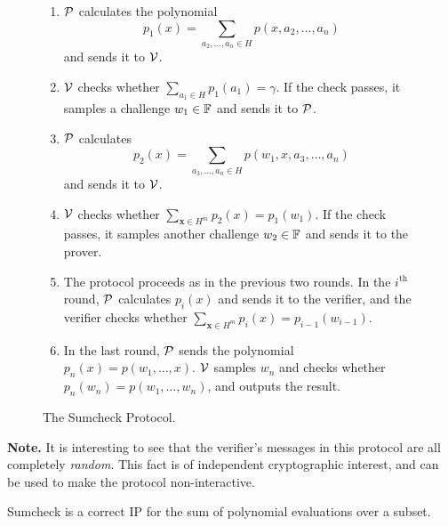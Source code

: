 \begin{figure}[h]
	\begin{mdframed}[
		linecolor=black,
		linewidth=1pt,
		roundcorner=5pt,
		backgroundcolor=white,
		userdefinedwidth=\textwidth,
		]
		\vspace{2mm}
		\begin{enumerate}
			\item $\mathcal{P}$ calculates the polynomial 
			$$p_1(x)=\sum_{a_2,\dots,a_n\in H}p(x, a_2,\dots,a_n)$$ and sends it to $\mathcal{V}$. 
			\item $\mathcal{V}$ checks whether $\sum_{a_1\in H}p_1(a_1)=\gamma$. If the check passes, it samples a challenge $w_1\in\mathbb{F}$ and sends it to $\mathcal{P}$.
			\item $\mathcal{P}$ calculates $$p_2(x)=\sum_{a_3,\dots,a_n\in H}p(w_1,x, a_3,\dots,a_n)$$ and sends it to $\mathcal{V}$.
			\item $\mathcal{V}$ checks whether $\sum_{\mathbf{x}\in H^m}p_2(x)=p_1(w_1)$. If the check passes, it samples another challenge $w_2\in\mathbb{F}$ and sends it to the prover.
			\item The protocol proceeds as in the previous two rounds. In the $i^{\text{th}}$ round, $\mathcal{P}$ calculates $p_i(x)$ and sends it to the verifier, and the verifier checks whether $\sum_{\mathbf{x}\in H^m}p_i(x)=p_{i-1}(w_{i-1}).$
			\item In the last round, $\mathcal{P}$ sends the polynomial $p_n(x)=p(w_1,\dots,x)$. $\mathcal{V}$ samples $w_n$ and checks whether $p_n(w_n)=p(w_1,\dots,w_n)$, and outputs the result.
		\end{enumerate}
		\vspace{2mm}
	\end{mdframed}
	\caption{The Sumcheck Protocol.}
	\label{fig:3}
\end{figure}

\textbf{Note.} It is interesting to see that the verifier's messages in this protocol are all completely \textit{random}. This fact is of independent cryptographic interest, and can be used to make the protocol non-interactive.
\vspace{3mm}

\begin{theorem}
	Sumcheck is a correct IP for the sum of polynomial evaluations over a subset.
\end{theorem}

